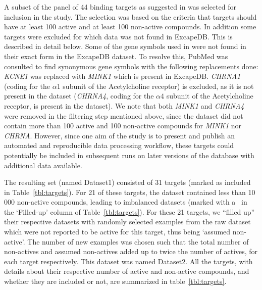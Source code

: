 \documentclass[utf8]{frontiersSCNS} %
\begin{document}
A subset of the panel of 44 binding targets as suggested in \cite{Bowes2012}
was selected for inclusion in the study. The selection was based on the
criteria that targets should have at least 100 active and at least 100
non-active compounds.  In addition some targets were excluded for which data
was not found in ExcapeDB. This is described in detail below.
%
Some of the gene symbols used in \cite{Bowes2012} were not found in their exact
form in the ExcapeDB dataset. To resolve this, PubMed was consulted to find
synonymous gene symbols with the following replacements done:
%
\textit{KCNE1} was replaced with \textit{MINK1} which is present in ExcapeDB.
\textit{CHRNA1} (coding for the $\alpha1$ subunit of the Acetylcholine
receptor) is excluded, as it is not present in the dataset (\textit{CHRNA4},
coding for the $\alpha4$ subunit of the Acetylcholine receptor, is present in
the dataset). We note that both \textit{MINK1} and \textit{CHRNA4} were removed
in the filtering step mentioned above, since the dataset did not contain more
than 100 active and 100 non-active compounds for \textit{MINK1} nor
\textit{CHRNA}.  However, since one aim of the study is to present and publish
an automated and reproducible data processing workflow, these targets could
potentially be included in subsequent runs on later versions of the database
with additional data available.

The resulting set (named Dataset1) consisted of 31 targets (marked as included in
Table~\ref{tbl:targets}).  For 21 of these targets, the dataset contained less
than 10\,000 non-active compounds, leading to imbalanced datasets (marked with
a \checkmark\ in the `Filled-up' column of Table~\ref{tbl:targets}).
%
For these 21 targets, we ``filled up'' their respective datasets with randomly
selected examples from the raw dataset which were not reported to be active for
this target, thus being `assumed non-active'. The number of new examples was chosen such that the total
number of non-actives and assumed non-actives added up to twice the number of
actives, for each target respectively. This dataset was named Dataset2.
%
All the targets, with details about their respective number of active and
non-active compounds, and whether they are included or not, are summarized in
table~\ref{tbl:targets}.
\end{document}
